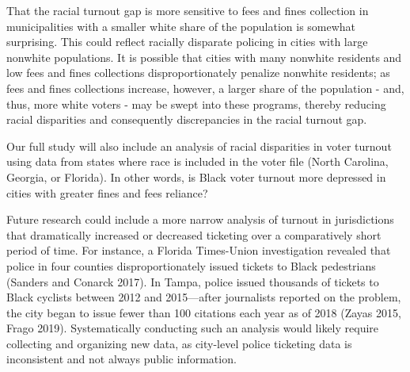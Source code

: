 \documentclass[
  12pt,
]{article}
\begin{document}
That the racial turnout gap is more sensitive to fees and fines collection in municipalities with a smaller white share of the population is somewhat surprising. This could reflect racially disparate policing in cities with large nonwhite populations. It is possible that cities with many nonwhite residents and low fees and fines collections disproportionately penalize nonwhite residents; as fees and fines collections increase, however, a larger share of the population - and, thus, more white voters - may be swept into these programs, thereby reducing racial disparities and consequently discrepancies in the racial turnout gap.

Our full study will also include an analysis of racial disparities in voter turnout using data from states where race is included in the voter file (North Carolina, Georgia, or Florida). In other words, is Black voter turnout more depressed in cities with greater fines and fees reliance?

Future research could include a more narrow analysis of turnout in jurisdictions that dramatically increased or decreased ticketing over a comparatively short period of time. For instance, a Florida Times-Union investigation revealed that police in four counties disproportionately issued tickets to Black pedestrians (Sanders and Conarck 2017). In Tampa, police issued thousands of tickets to Black cyclists between 2012 and 2015---after journalists reported on the problem, the city began to issue fewer than 100 citations each year as of 2018 (Zayas 2015, Frago 2019). Systematically conducting such an analysis would likely require collecting and organizing new data, as city-level police ticketing data is inconsistent and not always public information.
\end{document}
